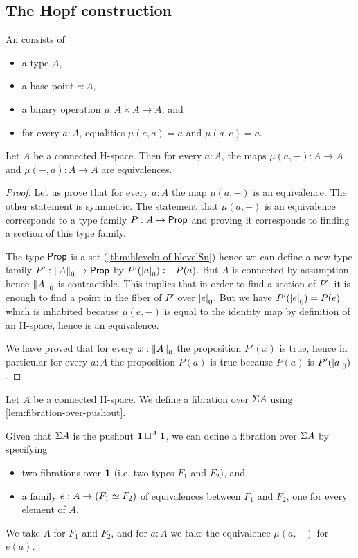 \subsection{The Hopf construction}

\begin{defn}
  An 
  consists of
  \begin{itemize}
  \item a type $A$,
  \item a base point $e:A$,
  \item a binary operation $\mu:A\times A\to A$, and
  \item for every $a:A$, equalities $\mu(e,a)=a$ and $\mu(a,e)=a$.
  \end{itemize}
\end{defn}

\begin{lem}
  Let $A$ be a connected H-space. Then for every $a:A$, the maps $\mu(a,-):A\to
  A$ and $\mu(-,a):A\to A$ are equivalences.
\end{lem}

\begin{proof}
  Let us prove that for every $a:A$ the map $\mu(a,-)$ is an equivalence. The
  other statement is symmetric.
  The statement that $\mu(a,-)$ is an equivalence corresponds to a type family
  $P:A\to\prop$ and proving it corresponds to finding a section of this type
  family.

  The type $\prop$ is a set (\autoref{thm:hleveln-of-hlevelSn}) hence we can
  define a new type family $P':\trunc0A\to\prop$ by $P'(\tproj0a)\defeq
  P(a)$. But $A$ is connected by assumption, hence $\trunc0A$ is
  contractible. This implies that in order to find a section of $P'$, it is
  enough to find a point in the fiber of $P'$ over $\tproj0e$. But we have
  $P'(\tproj0e)=P(e)$ which is inhabited because $\mu(e,-)$ is equal to the
  identity map by definition of an H-space, hence is an equivalence.

  We have proved that for every $x:\trunc0A$ the proposition $P'(x)$ is true,
  hence in particular for every $a:A$ the proposition $P(a)$ is true because
  $P(a)$ is $P'(\tproj0a)$.
\end{proof}

\begin{defn}
  Let $A$ be a connected H-space. We define a fibration over $\susp A$ using
  \autoref{lem:fibration-over-pushout}.

  Given that $\susp A$ is the pushout $\unit\sqcup^A\unit$, we can define a
  fibration over $\susp A$ by specifying
  \begin{itemize}
  \item two fibrations over $\unit$ (i.e. two types $F_1$ and $F_2$), and
  \item a family $e:A\to(\eqv{F_1}{F_2})$ of equivalences between
    $F_1$ and $F_2$, one for every element of $A$.
  \end{itemize}
  We take $A$ for $F_1$ and $F_2$, and for $a:A$ we take the equivalence
  $\mu(a,-)$ for $e(a)$.
\end{defn}

